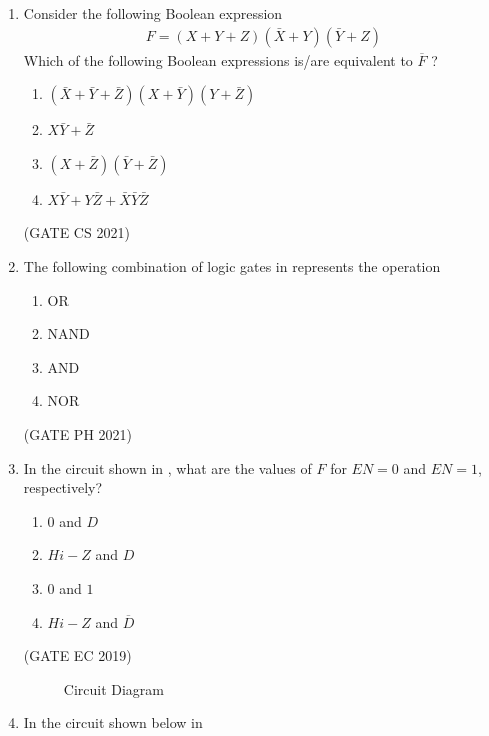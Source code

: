 \begin{enumerate}[label=\arabic*.,ref=\theenumi]
\begin{figure}[H]
	\caption{}
\label{fig:GATE IN 2021}
\end{figure}
%
\item Consider the following Boolean expression 
\begin{align*} F = (X+Y+Z)(\bar{X}+Y)(\bar{Y}+Z) \end{align*}
%       
Which of the following Boolean expressions is/are equivalent to $\overline{F}$ ?
% 
\begin{enumerate}                                     
\item $(\bar{X}+\bar{Y}+\bar{Z})(X+\bar{Y})(Y+\bar{Z})$
\item $X\bar{Y}+\bar{Z}$
\item $(X+\bar{Z})(\bar{Y}+\bar{Z})$
\item $X\bar{Y}+Y\bar{Z}+\bar{X}\bar{Y}\bar{Z}$ 
\end{enumerate}
\hfill{(GATE CS 2021)}
\item  The following combination of logic gates
in
	represents the operation
	\begin{enumerate}
       \item OR
       \item NAND
       \item AND
       \item NOR
   \end{enumerate}
%
 \hfill(GATE PH 2021)
	      \begin{figure}[H]
		      \centering
		      \resizebox{0.25\columnwidth}{!}{%
		      
		      }
	              \caption{}
		      \label{fig:GATE PH 2021}
	      \end{figure}
%
\item In the circuit shown
	in ,
	what are the values of $F$ for $EN=0$ and $EN=1$,  respectively?
\begin{enumerate}
    \item $0$ and $D$
    \item $Hi-Z$ and $D$
    \item $0$ and $1$
    \item $Hi-Z$ and $\overline{D}$
\end{enumerate}
 \hfill(GATE EC 2019)  
%
\begin{figure}[H]
    \centering
    \resizebox{0.5\columnwidth}{!}{%
    
	}
    \caption{Circuit Diagram}
	\label{fig:GATE-EC2019,14} 
\end{figure}
\item In the circuit shown below in 

\end{enumerate}
